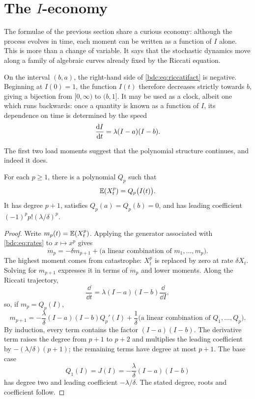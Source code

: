 \section{The \texorpdfstring{$I$}{I}-economy}
\label{bdc:sec:economy}

The formulae of the previous section share a curious economy: although the
process evolves in time, each moment can be written as a function of $I$ alone.
This is more than a change of variable. It says that the stochastic dynamics
move along a family of algebraic curves already fixed by the Riccati equation.

On the interval $(b,a)$, the right-hand side of
\cref{bdc:eq:riccatifact} is negative. Beginning at $I(0)=1$, the function
$I(t)$ therefore decreases strictly towards $b$, giving a bijection from
$[0,\infty)$ to $(b,1]$. It may be used as a clock, albeit one which runs
backwards: once a quantity is known as a function of $I$, its dependence on time
is determined by the speed
\[
\frac{\mathrm{d} I}{\mathrm{d} t}=\lambda(I-a)(I-b).
\]

The first two load moments suggest that the polynomial structure continues, and
indeed it does.

\begin{proposition}
\label{bdc:prop:polynomial}
For each $p\ge1$, there is a polynomial $Q_p$ such that
\[
\mathbb{E}\!\left(X_t^p\right)=Q_p\bigl(I(t)\bigr).
\]
It has degree $p+1$, satisfies $Q_p(a)=Q_p(b)=0$, and has leading coefficient
$(-1)^p p!(\lambda/\delta)^p$.
\end{proposition}

\begin{proof}
Write $m_p(t)=\mathbb{E}\!\left(X_t^p\right)$. Applying the generator associated with
\cref{bdc:eq:rates} to $x\mapsto x^p$ gives
\[
\dot m_p
=-\delta m_{p+1}
+\bigl(\text{a linear combination of }m_1,\ldots,m_p\bigr).
\]
The highest moment comes from catastrophe: $X_t^p$ is replaced by zero at rate
$\delta X_t$. Solving for $m_{p+1}$ expresses it in terms of $\dot m_p$ and
lower moments. Along the Riccati trajectory,
\[
\frac{\dd}{\dd t}
=\lambda(I-a)(I-b)\frac{\dd}{\dd I},
\]
so, if $m_p=Q_p(I)$,
\[
m_{p+1}
=-\frac{\lambda}{\delta}(I-a)(I-b)Q_p'(I)
+\frac{1}{\delta}
\bigl(\text{a linear combination of }Q_1,\ldots,Q_p\bigr).
\]
By induction, every term contains the factor $(I-a)(I-b)$. The derivative term
raises the degree from $p+1$ to $p+2$ and multiplies the leading coefficient by
$-(\lambda/\delta)(p+1)$; the remaining terms have degree at most $p+1$.
The base case
\[
Q_1(I)=J(I)=-\frac{\lambda}{\delta}(I-a)(I-b)
\]
has degree two and leading coefficient $-\lambda/\delta$. The stated degree,
roots and coefficient follow.
\end{proof}


